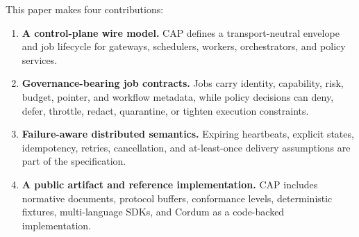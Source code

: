 This paper makes four contributions:
\begin{enumerate}[leftmargin=*,nosep]
  \item \textbf{A control-plane wire model.} CAP defines a transport-neutral envelope and job lifecycle for gateways, schedulers, workers, orchestrators, and policy services.
  \item \textbf{Governance-bearing job contracts.} Jobs carry identity, capability, risk, budget, pointer, and workflow metadata, while policy decisions can deny, defer, throttle, redact, quarantine, or tighten execution constraints.
  \item \textbf{Failure-aware distributed semantics.} Expiring heartbeats, explicit states, idempotency, retries, cancellation, and at-least-once delivery assumptions are part of the specification.
  \item \textbf{A public artifact and reference implementation.} CAP includes normative documents, protocol buffers, conformance levels, deterministic fixtures, multi-language SDKs, and Cordum as a code-backed implementation.
\end{enumerate}
